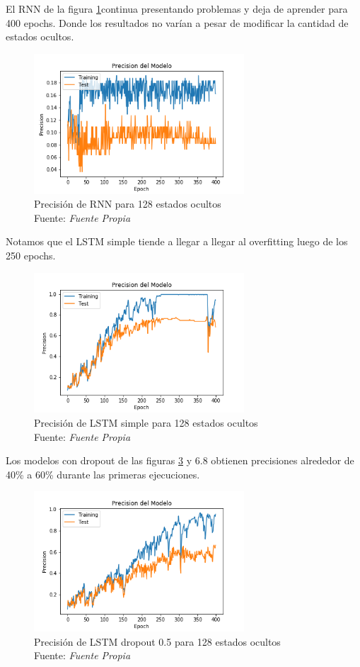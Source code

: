El RNN de la figura \ref{RNNSIMPLE}continua presentando problemas y deja de aprender para 400 epochs. Donde los resultados no varían a pesar de modificar la cantidad de estados ocultos.
\begin{figure}[H]
	\centering
	\includegraphics[width=0.7\textwidth]{Figures/rnn_prec_400_13mfcc}
	\caption{Precisión de RNN para 128 estados ocultos\\ Fuente: {\textit{Fuente Propia}}}
	\label{RNNSIMPLE}
\end{figure} 
Notamos que el LSTM simple tiende a llegar a llegar al overfitting luego de los 250 epochs.
\begin{figure}[H]
	\centering
	\includegraphics[width=0.7\textwidth]{Figures/lstm_400_prec_13mfcc}
	\caption{Precisión de LSTM simple para 128 estados ocultos\\ Fuente: {\textit{Fuente Propia}}}
	\label{LSTMsimpel}
\end{figure} 

Los modelos con dropout de las figuras \ref{LSTMdropout5} y 6.8 obtienen precisiones alrededor de 40\% a 60\% durante las primeras ejecuciones. 
\begin{figure}[H]
	\centering
	\includegraphics[width=0.7\textwidth]{Figures/lstm_400drop05_prec_13mfcc}
	\caption{Precisión de LSTM dropout 0.5 para 128 estados ocultos\\ Fuente: {\textit{Fuente Propia}}}
	\label{LSTMdropout5}
\end{figure} 


